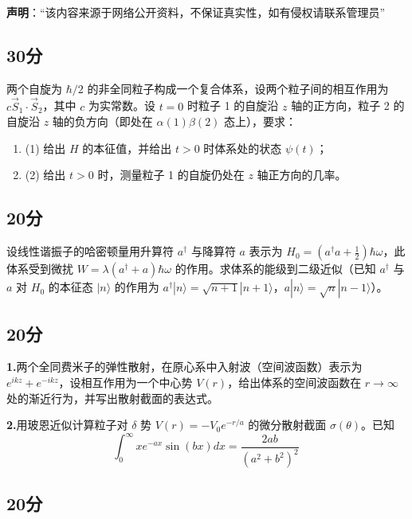 
\textbf{声明}：“该内容来源于网络公开资料，不保证真实性，如有侵权请联系管理员”

\subsection{30分}
两个自旋为 $\hbar/2$ 的非全同粒子构成一个复合体系，设两个粒子间的相互作用为 $c\vec{S}_1 \cdot \vec{S}_2$，其中 $c$ 为实常数。设 $t=0$ 时粒子 1 的自旋沿 $z$ 轴的正方向，粒子 2 的自旋沿 $z$ 轴的负方向（即处在 $\alpha(1)\beta(2)$ 态上），要求：

\begin{enumerate}
    \item (1) 给出 $H$ 的本征值，并给出 $t > 0$ 时体系处的状态 $\psi(t)$；
    \item (2) 给出 $t > 0$ 时，测量粒子 1 的自旋仍处在 $z$ 轴正方向的几率。
\end{enumerate}
\subsection{20分}
设线性谐振子的哈密顿量用升算符 $a^\dagger$ 与降算符 $a$ 表示为 $H_0 = \left(a^\dagger a + \frac{1}{2}\right)\hbar\omega$，此体系受到微扰 $W = \lambda(a^\dagger + a)\hbar\omega$ 的作用。求体系的能级到二级近似（已知 $a^\dagger$ 与 $a$ 对 $H_0$ 的本征态 $|n\rangle$ 的作用为 $a^\dagger|n\rangle = \sqrt{n+1}|n+1\rangle$，$a|n\rangle = \sqrt{n}|n-1\rangle$）。
\subsection{20分}
\textbf{1.}两个全同费米子的弹性散射，在原心系中入射波（空间波函数）表示为 $e^{ikz} + e^{-ikz}$，设相互作用为一个中心势 $V(r)$，给出体系的空间波函数在 $r \to \infty$ 处的渐近行为，并写出散射截面的表达式。

\textbf{2.}用玻恩近似计算粒子对 $\delta$ 势 $V(r) = -V_0 e^{-r/a}$ 的微分散射截面 $\sigma(\theta)$。已知
$$\int_{0}^{\infty} x e^{-ax} \sin(bx) dx = \frac{2ab}{(a^2 + b^2)^2}~$$
\subsection{20分}